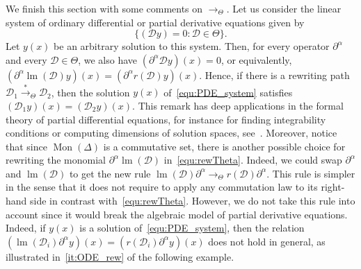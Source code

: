 \documentclass[10pt]{easychair}
\theoremstyle{definition}
\newcommand\D{\mathcal{D}}
\DeclareMathOperator{\lm}{lm}
\newcommand\monBasis{\Mon(\Delta)}
\DeclareMathOperator{\Mon}{Mon}
\newcommand\transTheta{\overset{*}{\to}_\Theta}
\newcommand\rewTheta{\to_\Theta}
\begin{document}
We finish this section with some comments on $\rewTheta$. Let us consider 
the linear system of ordinary differential or partial derivative
equations given by 
\begin{equation}\label{equ:PDE_system}
  \{(\D y)=0:\D\in\Theta\}.
\end{equation}
Let $y(x)$ be an arbitrary solution to this system. Then, for every
operator $\partial^\alpha$ and every $\D\in\Theta$, we also have
$(\partial^\alpha\D y)(x)=0$, or equivalently,
$(\partial^\alpha\lm(\D)y)(x)=(\partial^\alpha r(\D)y)(x)$. Hence, if
there is a rewriting path $\D_1\transTheta\D_2$, then the solution $y(x)$
of~\eqref{equ:PDE_system} satisfies $(\D_1y)(x)=(\D_2y)(x)$. This remark
has deep applications in the formal theory of partial differential
equations, for instance for finding integrability conditions or computing
dimensions of solution spaces, see~\cite{MR1308976}. Moreover, notice
that since $\monBasis$ is a commutative set, there is another possible
choice for rewriting the monomial $\partial^\alpha\lm(\D)$
in~\eqref{equ:rewTheta}. Indeed, we could swap $\partial^\alpha$ and
$\lm(\D)$ to get the new rule
$\lm(\D)\partial^\alpha\rewTheta r(\D)\partial^\alpha$. This rule is
simpler in the sense that it does not require to apply any commutation 
law to its right-hand side in contrast with~\eqref{equ:rewTheta}.
However, we do not take this rule into account since it would break the
algebraic model of partial derivative equations. Indeed, if $y(x)$ is a
solution of~\eqref{equ:PDE_system}, then the relation
$(\lm(\D_i)\partial^\alpha y)(x)=(r(\D_i)\partial^\alpha y)(x)$ does not
hold in general, as illustrated in~\ref{it:ODE_rew} of the following
example.
\smallskip
\end{document}
